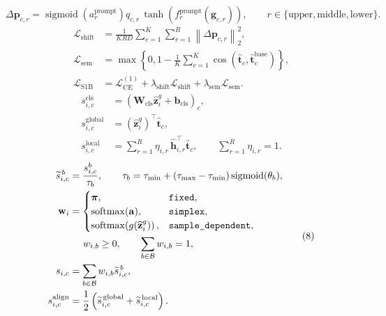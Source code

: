 \documentclass{article}
\begin{document}
\begin{equation}
\Delta\mathbf{p}_{c,r}
=
\operatorname{sigmoid}\!\left(a_r^{\mathrm{prompt}}\right)q_{c,r}\,
\tanh\!\left(f_r^{\mathrm{prompt}}\!\left(\mathbf{g}_{c,r}\right)\right),
\qquad
r\in\{\mathrm{upper},\mathrm{middle},\mathrm{lower}\}.
\tag{5}
\end{equation}
\begin{equation}
\begin{aligned}
\mathcal{L}_{\mathrm{shift}}
&=
\frac{1}{KRD}
\sum_{c=1}^{K}\sum_{r=1}^{R}
\left\|\Delta\mathbf{p}_{c,r}\right\|_2^2, \\
\mathcal{L}_{\mathrm{sem}}
&=
\max\!\left\{
0,
1-\frac{1}{K}\sum_{c=1}^{K}
\cos\!\left(
\widehat{\mathbf{t}}_c,
\widehat{\mathbf{t}}^{\mathrm{base}}_c
\right)
\right\}, \\
\mathcal{L}_{\mathrm{S1B}}
&=
\mathcal{L}_{\mathrm{CE}}^{(1)}
+\lambda_{\mathrm{shift}}\mathcal{L}_{\mathrm{shift}}
+\lambda_{\mathrm{sem}}\mathcal{L}_{\mathrm{sem}}.
\end{aligned}
\tag{6}
\end{equation}
\begin{equation}
\begin{aligned}
s^{\mathrm{cls}}_{i,c}
&=
\left(\mathbf{W}_{\mathrm{cls}}\widehat{\mathbf{z}}^{g}_i
+\mathbf{b}_{\mathrm{cls}}\right)_c, \\
s^{\mathrm{global}}_{i,c}
&=
\left(\widehat{\mathbf{z}}^{g}_i\right)^{\top}
\widehat{\mathbf{t}}_c, \\
s^{\mathrm{local}}_{i,c}
&=
\sum_{r=1}^{R}\eta_{i,r}\,
\widehat{\mathbf{h}}_{i,r}^{\top}\widehat{\mathbf{t}}_c,
\qquad
\sum_{r=1}^{R}\eta_{i,r}=1.
\end{aligned}
\tag{7}
\end{equation}
\begin{equation}
\begin{aligned}
\widetilde{s}^{\,b}_{i,c}
&=
\frac{s^{b}_{i,c}}{\tau_b},
\qquad
\tau_b
=
\tau_{\min}
+(\tau_{\max}-\tau_{\min})\operatorname{sigmoid}(\theta_b), \\
\mathbf{w}_i
&=
\begin{cases}
\boldsymbol{\pi},
& \texttt{fixed}, \\
\operatorname{softmax}(\mathbf{a}),
& \texttt{simplex}, \\
\operatorname{softmax}\!\left(g(\widehat{\mathbf{z}}^{g}_i)\right),
& \texttt{sample\_dependent},
\end{cases} \\
&\hspace{1.4em}w_{i,b}\ge 0,
\qquad
\sum_{b\in\mathcal{B}}w_{i,b}=1, \\
s_{i,c}
&=
\sum_{b\in\mathcal{B}}
w_{i,b}\widetilde{s}^{\,b}_{i,c}, \\
s^{\mathrm{align}}_{i,c}
&=
\frac{1}{2}
\left(
\widetilde{s}^{\,\mathrm{global}}_{i,c}
+\widetilde{s}^{\,\mathrm{local}}_{i,c}
\right).
\end{aligned}
\tag{8}
\end{equation}
\end{document}
